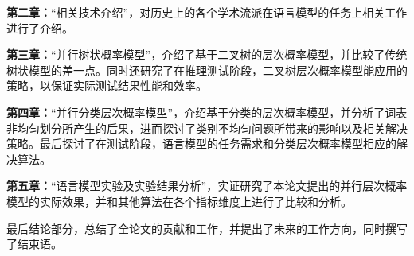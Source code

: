 \textbf{第二章：}``相关技术介绍''，对历史上的各个学术流派在语言模型的任务上相关工作进行了介绍。

\textbf{第三章：}``并行树状概率模型''，介绍了基于二叉树的层次概率模型，并比较了传统树状模型的差一点。同时还研究了在推理测试阶段，二叉树层次概率模型能应用的策略，以保证实际测试结果性能和效率。


\textbf{第四章：}``并行分类层次概率模型''，介绍基于分类的层次概率模型，并分析了词表非均匀划分所产生的后果，进而探讨了类别不均匀问题所带来的影响以及相关解决策略。最后探讨了在测试阶段，语言模型的任务需求和分类层次概率模型相应的解决算法。

\textbf{第五章：}``语言模型实验及实验结果分析''，实证研究了本论文提出的并行层次概率模型的实际效果，并和其他算法在各个指标维度上进行了比较和分析。

最后结论部分，总结了全论文的贡献和工作，并提出了未来的工作方向，同时撰写了结束语。



